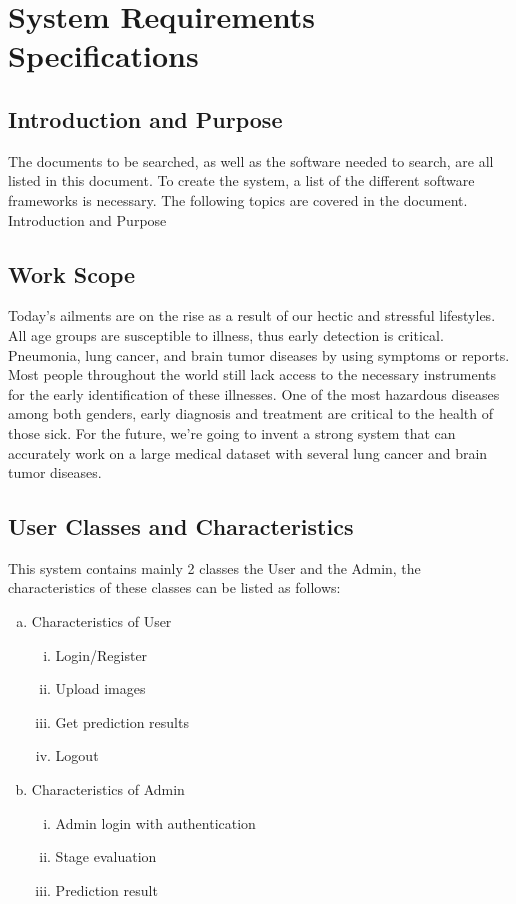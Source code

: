 \chapter{System Requirements Specifications}
\section{Introduction and Purpose}

 The documents to be searched, as well as the software needed to search, are all listed in this document. To create the system, a list of the different software frameworks is necessary. The following topics are covered in the document.
 Introduction and Purpose
\section{Work Scope}
 Today's ailments are on the rise as a result of our hectic and stressful lifestyles. All age groups are susceptible to illness, thus early detection is critical. Pneumonia, lung cancer, and brain tumor diseases by using symptoms or reports. Most people throughout the world still lack access to the necessary instruments for the early identification of these illnesses. One of the most hazardous diseases among both genders, early diagnosis and treatment are critical to the health of those sick. For the future, we're going to invent a strong system that can accurately work on a large medical dataset with several lung cancer and brain tumor diseases.
 
\section{User Classes and Characteristics}

This system contains mainly 2 classes the User and the Admin, the characteristics of these classes can be listed as follows:

\begin{enumerate}[a)]
    \item Characteristics of User
    \begin{enumerate}[i)]
        \item Login/Register
        \item Upload images
        \item Get prediction results
        \item Logout
        \end{enumerate}
        \item Characteristics of Admin
            \begin{enumerate}[i)]
            \item Admin login with authentication
            \item Stage evaluation
            \item Prediction result
    \end{enumerate}
\end{enumerate}

